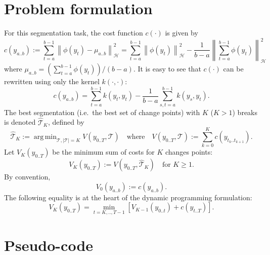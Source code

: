 \documentclass[12pt]{article}
\newcommand\HH{\mathcal{H}}
\newcommand{\norm}[1]{\left\lVert#1\right\rVert}
\newcommand{\TT}{\mathcal{T}}
\newcommand{\TThat}{\widehat{\mathcal{T}}}
\DeclareMathOperator*{\argmin}{arg\,min}
\begin{document}
\section{Problem formulation}
For this segmentation task, the cost function $c(\cdot)$ is given by
\begin{equation}
    c(y_{a..b}) := \sum_{t=a}^{b-1} \norm{\phi(y_t) - \mu_{a..b}}_{\HH}^2 = \sum_{t=a}^{b-1} \norm{\phi(y_t)}_{\HH}^2 - \frac{1}{b-a}\norm{\sum_{t=a}^{b-1} \phi(y_t)}^2_\HH
\end{equation}
where $\mu_{a..b} = (\sum_{t=a}^{b-1} \phi(y_t))/(b-a)$.
It is easy to see that $c(\cdot)$ can be rewritten using only the kernel $k(\cdot, \cdot)$:
\begin{equation}
    c(y_{a..b}) = \sum_{t=a}^{b-1} k(y_t, y_t) - \frac{1}{b-a} \sum_{s,t=a}^{b-1} k(y_s,y_t).
\end{equation}
The best segmentation (i.e.\ the best set of change points) with $K$ ($K>1$) breaks is denoted $\TThat_K$, defined by
\begin{equation}
    \TThat_K := \argmin_{\TT, |\TT|=K} V(y_{0..T}, \TT)\quad\text{where}\quad V(y_{0..T}, \TT):= \sum_{k=0}^{K} c(y_{t_k..t_{k+1}}).
    \label{eq:min-sum-of-cost}
\end{equation}
Let $V_K(y_{0..T})$ be the minimum sum of costs for $K$ changes points:
\begin{equation}
    V_K(y_{0..T}) := V(y_{0..T}, \TThat_K) \quad\text{for } K\geq1.
\end{equation}
By convention,
\begin{equation}
    V_0(y_{a..b}) := c(y_{a..b}).
\end{equation}
The following equality is at the heart of the dynamic programming formulation:
\begin{equation}
    V_K(y_{0..T}) = \min_{t=K,..,T-1} \left[V_{K-1}(y_{0..t}) + c(y_{t..T})\right].
\end{equation}

\section{Pseudo-code}
\end{document}
